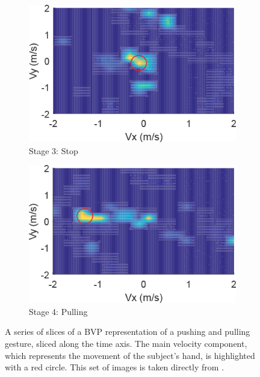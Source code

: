 \begin{figure}[t]
\begin{subfigure}{0.22\textwidth}
		\includegraphics[width=\textwidth]{figures/bvp_stage_3_stop}
		\caption{Stage 3: Stop}
	\end{subfigure}
	\hfill
	\begin{subfigure}{0.22\textwidth}
		\centering
		\includegraphics[width=\textwidth]{figures/bvp_stage_4_pulling}
		\caption{Stage 4: Pulling}
	\end{subfigure}
	\caption{A series of slices of a BVP representation of a pushing and pulling gesture, sliced along the time axis. The main velocity component, which represents the movement of the subject's hand, is highlighted with a red circle. This set of images is taken directly from \cite{zheng2019zero}.}
	\label{fig:bvp-example}
\end{figure}

